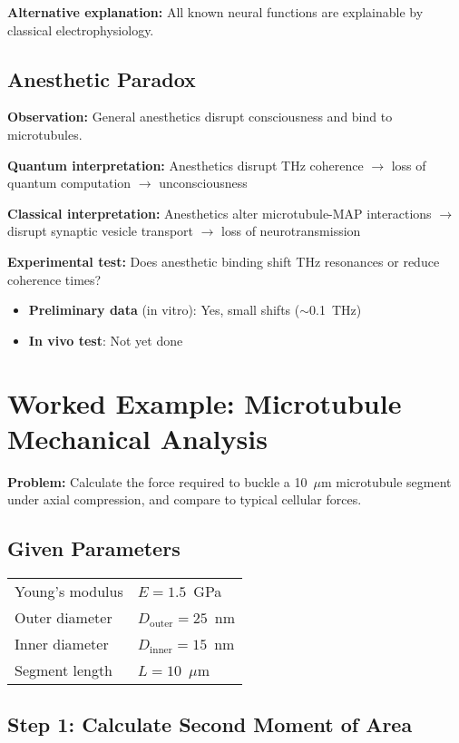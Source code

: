 \textbf{Alternative explanation:} All known neural functions are explainable by classical electrophysiology.

\subsection{Anesthetic Paradox}

\textbf{Observation:} General anesthetics disrupt consciousness and bind to microtubules.

\textbf{Quantum interpretation:} Anesthetics disrupt THz coherence $\rightarrow$ loss of quantum computation $\rightarrow$ unconsciousness

\textbf{Classical interpretation:} Anesthetics alter microtubule-MAP interactions $\rightarrow$ disrupt synaptic vesicle transport $\rightarrow$ loss of neurotransmission

\textbf{Experimental test:} Does anesthetic binding shift THz resonances or reduce coherence times?
\begin{itemize}
\item \textbf{Preliminary data} (in vitro): Yes, small shifts ($\sim$0.1~THz)
\item \textbf{In vivo test}: Not yet done
\end{itemize}

\section{Worked Example: Microtubule Mechanical Analysis}

\textbf{Problem:} Calculate the force required to buckle a 10~$\mu$m microtubule segment under axial compression, and compare to typical cellular forces.

\subsection*{Given Parameters}

\begin{tabular}{@{}ll@{}}
Young's modulus & $E = 1.5$~GPa \\
Outer diameter & $D_{\mathrm{outer}} = 25$~nm \\
Inner diameter & $D_{\mathrm{inner}} = 15$~nm \\
Segment length & $L = 10$~$\mu$m \\
\end{tabular}

\subsection*{Step 1: Calculate Second Moment of Area}

